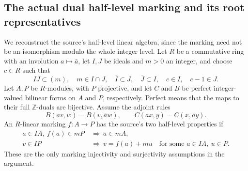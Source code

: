 \subsection{The actual dual half-level marking and its root representatives}
\label{subsec:ftb-actual-dual-half-marking}

We reconstruct the source's half-level linear algebra, since the
marking need not be an isomorphism modulo the whole integer level.
Let \(R\) be a commutative ring with an involution \(a\mapsto\bar a\),
let \(I,J\) be ideals and \(m>0\) an integer, and choose \(c\in R\)
such that
\[
 IJ\subset(m),\quad m\in I\cap J,\quad
 \bar I\subset J,\quad\bar J\subset I,\quad
                         c\in I,\quad c-1\in J.           \tag{DM1}
\]
Let \(A,P\) be \(R\)-modules, with \(P\) projective, and let
\(C\) and \(B\) be perfect integer-valued bilinear forms on
\(A\) and \(P\), respectively.
Perfect means that the maps to their full
\(\mathbb Z\)-duals are bijective.
Assume the adjoint rules
\[
 B(av,w)=B(v,\bar a w),\qquad
 C(ax,y)=C(x,\bar a y).                                   \tag{DM2}
\]
An \(R\)-linear marking \(f:A\to P\) has the source's two
half-level properties if
\[
 \begin{split}
 a\in IA,\ f(a)\in mP&\ \Longrightarrow\ a\in mA,\\
 v\in IP&\ \Longrightarrow\
        v=f(a)+mu\quad\text{for some }a\in IA,\ u\in P .
 \end{split}                                             \tag{DM3}
\]
These are the only marking injectivity and surjectivity
assumptions in the argument.

